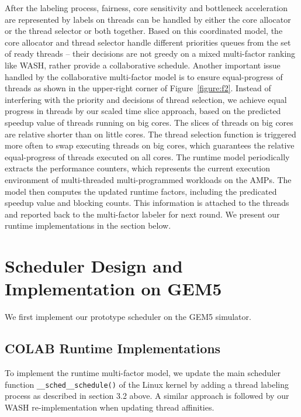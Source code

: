 After the labeling process, fairness, core sensitivity and bottleneck acceleration are represented by labels on threads can be handled by either the core allocator or the thread selector or both together. Based on this coordinated model, the core allocator and thread selector handle different priorities queues from the set of ready threads -- their decisions are not greedy on a mixed multi-factor ranking like WASH, rather provide a collaborative schedule.
Another important issue handled by the collaborative multi-factor model is to ensure equal-progress of threads as shown in the upper-right corner of Figure~\ref{figure:f2}. Instead of interfering with the priority and decisions of thread selection, we achieve equal progress in threads by our scaled time slice approach, based on the predicted speedup value of threads running on big cores. The slices of threads on big cores are relative shorter than on little cores. The thread selection function is triggered more often to swap executing threads on big cores, which guarantees the relative equal-progress of threads executed on all cores.
The runtime model periodically extracts the performance counters, which represents the current execution environment of multi-threaded multi-programmed workloads on the AMPs. The model then computes the updated runtime factors, including the predicated speedup value and blocking counts. This information is attached to the threads and reported back to the multi-factor labeler for next round. We present our runtime implementations in the section below. 

\section{Scheduler Design and Implementation on GEM5}
We first implement our prototype scheduler on the GEM5 simulator. \cite{binkert2011gem5}
\vspace{-1em}
\subsection{COLAB Runtime Implementations}
To implement the runtime multi-factor model, we update the main scheduler function \texttt{\_\_sched\_\_schedule()} of the Linux kernel by adding a thread labeling process as described in section 3.2 above. A similar approach is followed by our WASH re-implementation when updating thread affinities.

